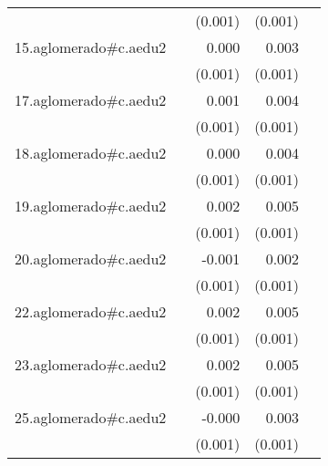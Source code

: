 {\begin{longtable}{l*{4}{D{.}{.}{-1}}}
            &                     &     (0.001)         &     (0.001)         &                     \\
\addlinespace
15.aglomerado#c.aedu2&                     &       0.000         &       0.003\sym{***}&                     \\
            &                     &     (0.001)         &     (0.001)         &                     \\
\addlinespace
17.aglomerado#c.aedu2&                     &       0.001         &       0.004\sym{***}&                     \\
            &                     &     (0.001)         &     (0.001)         &                     \\
\addlinespace
18.aglomerado#c.aedu2&                     &       0.000         &       0.004\sym{***}&                     \\
            &                     &     (0.001)         &     (0.001)         &                     \\
\addlinespace
19.aglomerado#c.aedu2&                     &       0.002         &       0.005\sym{***}&                     \\
            &                     &     (0.001)         &     (0.001)         &                     \\
\addlinespace
20.aglomerado#c.aedu2&                     &      -0.001         &       0.002         &                     \\
            &                     &     (0.001)         &     (0.001)         &                     \\
\addlinespace
22.aglomerado#c.aedu2&                     &       0.002         &       0.005\sym{***}&                     \\
            &                     &     (0.001)         &     (0.001)         &                     \\
\addlinespace
23.aglomerado#c.aedu2&                     &       0.002         &       0.005\sym{***}&                     \\
            &                     &     (0.001)         &     (0.001)         &                     \\
\addlinespace
25.aglomerado#c.aedu2&                     &      -0.000         &       0.003\sym{**} &                     \\
            &                     &     (0.001)         &     (0.001)         &                     \\

\end{longtable}}
